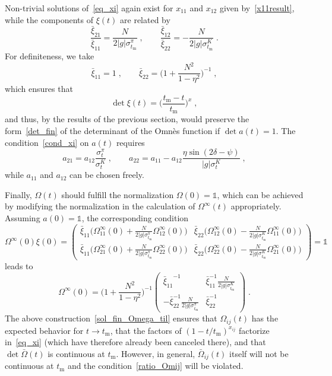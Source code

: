 \documentclass[11pt]{article}%
\providecommand{\ec}{\;,}
\providecommand{\ep}{\;.}
\newcommand{\tm}{t_\text{m}}
\newcommand{\beq}{\begin{equation}}
\newcommand{\eeq}{\end{equation}}
\begin{document}
Non-trivial solutions of~\eqref{eq_xi} again exist for $x_{11}$ and $x_{12}$ given by~\eqref{x11result}, while the components of $\xi(t)$ are related by
\beq
 \frac{\bar\xi_{21}}{\bar\xi_{11}}=\frac{N}{2|g|\sigma_{\tm}^\pi}\ec\qquad \frac{\bar\xi_{12}}{\bar\xi_{22}}=-\frac{N}{2|g|\sigma_{\tm}^K}\ep
\eeq
For definiteness, we take
\beq
\bar\xi_{11}=1\ec\qquad \bar\xi_{22}=\bigg(1+\frac{N^2}{1-\eta^2}\bigg)^{-1}\ec
\eeq
which ensures that
\beq
\det\xi(t)=\bigg(\frac{\tm-t}{\tm}\bigg)^x\ec
\eeq
and thus, by the results of the previous section, would preserve the form~\eqref{det_fin} of the determinant of the Omn\`es function if $\det a(t)=1$. 
The condition~\eqref{cond_xi} on $a(t)$ requires
\beq
a_{21}=a_{12}\frac{\sigma_t^\pi}{\sigma_t^K}\ec\qquad a_{22}=a_{11}-a_{12}\frac{\eta\sin(2\delta-\psi)}{|g|\sigma_t^K}\ec
\eeq
while $a_{11}$ and $a_{12}$ can be chosen freely.


Finally, $\Omega(t)$ should fulfill the normalization $\Omega(0)=\mathds{1}$, which can be achieved by modifying the normalization in the calculation of $\Omega^\infty(t)$ appropriately. Assuming $a(0)=\mathds{1}$, the corresponding condition 
\beq
\Omega^\infty(0)\xi(0)=\begin{pmatrix}
                 \bar\xi_{11}\big(\Omega^\infty_{11}(0)+\frac{N}{2|g|\sigma_{\tm}^\pi}\Omega^\infty_{12}(0)\big) & \bar\xi_{22}\big(\Omega^\infty_{12}(0)-\frac{N}{2|g|\sigma_{\tm}^K}\Omega^\infty_{11}(0)\big)\\
		  \bar\xi_{11}\big(\Omega^\infty_{21}(0)+\frac{N}{2|g|\sigma_{\tm}^\pi}\Omega^\infty_{22}(0)\big) & \bar\xi_{22}\big(\Omega^\infty_{22}(0)-\frac{N}{2|g|\sigma_{\tm}^K}\Omega^\infty_{21}(0)\big)
                \end{pmatrix}
=\mathds{1}
\eeq
leads to
\beq
\Omega^\infty(0)=\bigg(1+\frac{N^2}{1-\eta^2}\bigg)^{-1}\begin{pmatrix}
                 {\bar\xi_{11}}^{-1} & \bar\xi_{11}^{-1}\frac{N}{2|g|\sigma_{\tm}^K}\\
		  -\bar\xi_{22}^{-1}\frac{N}{2|g|\sigma_{\tm}^\pi} & \bar\xi_{22}^{-1}
                \end{pmatrix}\ep
\eeq
The above construction~\eqref{sol_fin_Omega_til} ensures that 
$\Omega_{ij}(t)$ has the expected behavior for $t\to\tm$,
that the factors of $(1-t/\tm)^{x_{ij}}$ factorize in~\eqref{eq_xi} (which have therefore already been canceled there),
and that $\det\bar \Omega(t)$ is continuous at $\tm$. However, 
 in general, $\bar \Omega_{ij}(t)$ itself will not be continuous at $\tm$
and the condition~\eqref{ratio_Omij} will be violated.
\end{document}
